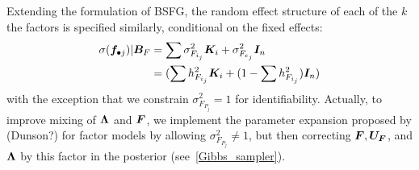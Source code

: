 \documentclass[11pt]{amsart}
\newcommand*{\B}[1]{\ifmmode\bm{#1}\else\textbf{#1}\fi}
\begin{document}
Extending the formulation of BSFG, the random effect structure of each of the $k$ the factors is specified similarly, conditional on the fixed effects:
\begin{align} \begin{split}
\sigma(\B{f}_{\bullet j} ) | \B{B}_F &= \sum \sigma^2_{F_{i_j}} \B{K}_i + \sigma^2_{F_{e_j}}\B{I}_n \\
&= (\sum h^2_{F_{i_j}} \B{K}_i + (1 - \sum h^2_{F_{i_j}})\B{I}_n) 
\end{split} \end{align}
\noindent with the exception that we constrain $\sigma^2_{F_{P_j}} = 1$ for identifiability. Actually, to improve mixing of $\B{\Lambda}$ and $\B{F}$, we implement the parameter expansion proposed by (Dunson?) for factor models by allowing $\sigma^2_{F_{P_j}} \neq1$, but then correcting $\B{F}, \B{U_F}$, and $\B{\Lambda}$ by this factor in the posterior (see~\ref{Gibbs_sampler}).
\end{document}
